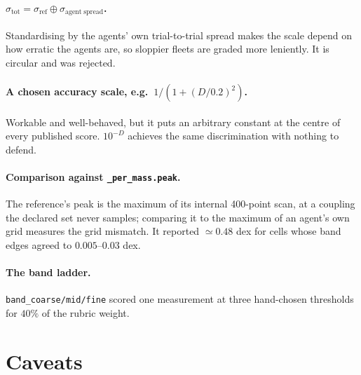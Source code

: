 \documentclass[11pt]{article}
\begin{document}
\paragraph{$\sigma_{\mathrm{tot}}=\sigma_{\mathrm{ref}}\oplus\sigma_{\mathrm{agent\;spread}}$.}
Standardising by the agents' own trial-to-trial spread makes the scale depend on
how erratic the agents are, so sloppier fleets are graded more leniently. It is
circular and was rejected.

\paragraph{A chosen accuracy scale, e.g.\ $1/(1+(D/0.2)^2)$.} Workable and
well-behaved, but it puts an arbitrary constant at the centre of every published
score. $10^{-D}$ achieves the same discrimination with nothing to defend.

\paragraph{Comparison against \texttt{\_per\_mass.peak}.} The reference's peak is
the maximum of its internal 400-point scan, at a coupling the declared set never
samples; comparing it to the maximum of an agent's own grid measures the grid
mismatch. It reported $\simeq0.48$ dex for cells whose band edges agreed to
$0.005$--$0.03$ dex.

\paragraph{The band ladder.} \texttt{band\_coarse/mid/fine} scored one
measurement at three hand-chosen thresholds for $40\%$ of the rubric weight.

\section{Caveats}\label{sec:caveats}
\end{document}
